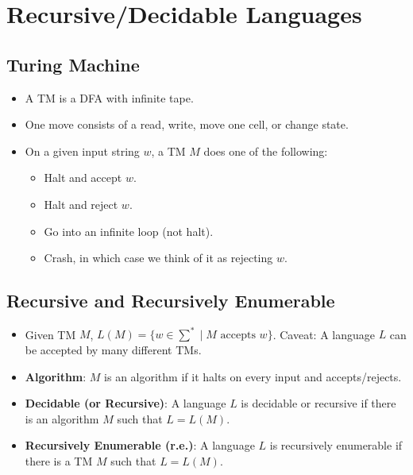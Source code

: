 
\section{Recursive/Decidable Languages}

\subsection{Turing Machine}
\begin{itemize}
    \item A TM is a DFA with infinite tape.
    \item One move consists of a read, write, move one cell, or change state.
    \item On a given input string $w$, a TM $M$ does one of the following:
    \begin{itemize}
        \item Halt and accept $w$.
        \item Halt and reject $w$.
        \item Go into an infinite loop (not halt).
        \item Crash, in which case we think of it as rejecting $w$.
    \end{itemize}
\end{itemize}

\subsection{Recursive and Recursively Enumerable}
\begin{itemize}
    \item Given TM $M$, $L(M) = \{ w \in \sum^\ast \mid \text{$M$ accepts $w$} \}$. Caveat: A language $L$ can be accepted by many different TMs.
    \item \textbf{Algorithm}: $M$ is an algorithm if it halts on every input and accepts/rejects.
    \item \textbf{Decidable (or Recursive)}: A language $L$ is decidable or recursive if there is an algorithm $M$ such that $L = L(M)$.
    \item \textbf{Recursively Enumerable (r.e.)}: A language $L$ is recursively enumerable if there is a TM $M$ such that $L = L(M)$.
\end{itemize}

